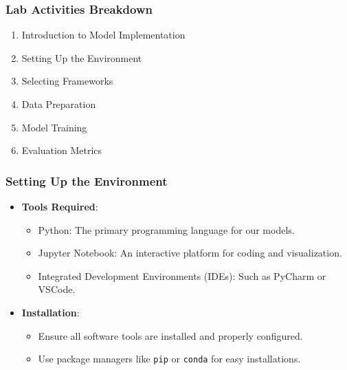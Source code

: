 \documentclass[aspectratio=169]{beamer}
\begin{document}
\begin{frame}
    \frametitle{Lab Activities Breakdown}
    \begin{enumerate}
        \item Introduction to Model Implementation
        \item Setting Up the Environment
        \item Selecting Frameworks
        \item Data Preparation
        \item Model Training
        \item Evaluation Metrics
    \end{enumerate}
\end{frame}

\begin{frame}[fragile]
    \frametitle{Setting Up the Environment}
    \begin{itemize}
        \item \textbf{Tools Required}:
            \begin{itemize}
                \item Python: The primary programming language for our models.
                \item Jupyter Notebook: An interactive platform for coding and visualization.
                \item Integrated Development Environments (IDEs): Such as PyCharm or VSCode.
            \end{itemize}
        \item \textbf{Installation}:
            \begin{itemize}
                \item Ensure all software tools are installed and properly configured.
                \item Use package managers like \texttt{pip} or \texttt{conda} for easy installations.
            \end{itemize}
    \end{itemize}
\end{frame}
\end{document}

